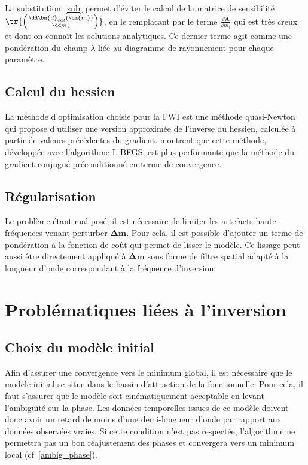 La substitution~\ref{sub} permet d'éviter le calcul de la matrice de sensibilité $\tr{\left( \frac{\dd \bm{d}_{cal}(\bm{m}) }{\dd m_{i}} \right)}$, en le remplaçant par le terme $\frac{\dd \bm{A}}{\dd m_{i}}$ qui est très creux et dont on connaît les solutions analytiques. Ce dernier terme agit comme une pondération du champ $\lambda$ liée au diagramme de rayonnement pour chaque paramètre.


\subsection{Calcul du hessien}

La méthode d'optimisation choisie pour la FWI est une méthode quasi-Newton qui propose d'utiliser une version approximée de l'inverse du hessien, calculée à partir de valeurs précédentes du gradient.  \cite{brossier_2009} montrent que cette méthode, développée avec l'algorithme L-BFGS, est plus performante que la méthode du gradient conjugué préconditionné en terme de convergence. 

\subsection{Régularisation}

Le problème étant mal-posé, il est nécessaire de limiter les artefacts haute-fréquences venant perturber $\bm{\Delta m}$. Pour cela, il est possible d'ajouter un terme de pondération à la fonction de coût qui permet de lisser le modèle. Ce lissage peut aussi être directement appliqué à $\bm{\Delta m}$ sous forme de filtre spatial adapté à la longueur d'onde correspondant à la fréquence d'inversion.

\section{Problématiques liées à l'inversion}

\subsection{Choix du modèle initial \label{fwi:choix_modele}}
Afin d'assurer une convergence vers le minimum global, il est nécessaire que le modèle initial se situe dans le bassin d'attraction de la fonctionnelle. Pour cela, il faut s'assurer que le modèle soit cinématiquement acceptable en levant l’ambiguïté sur la phase. Les données temporelles issues de ce modèle doivent donc avoir un retard de moins d'une demi-longueur d'onde par rapport aux données observées vraies. Si cette condition n'est pas respectée, l'algorithme ne permettra pas un bon réajustement des phases et convergera vers un minimum local (cf~\ref{ambig_phase}).


